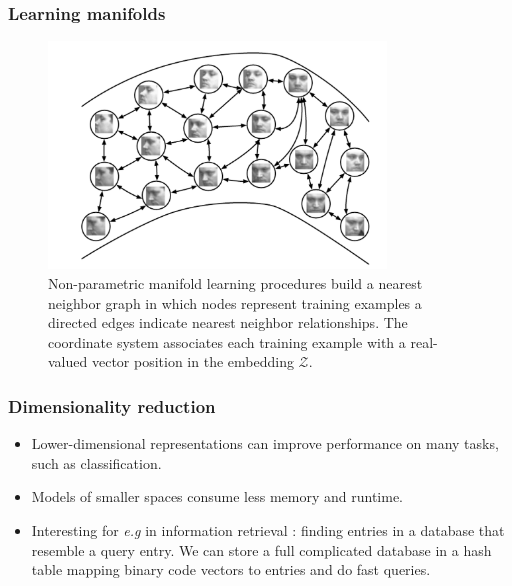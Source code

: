 \documentclass[french,9pt]{beamer}
\begin{document}
\begin{frame}
\frametitle{Learning manifolds}

\begin{figure}
  \begin{center}
    \includegraphics[width=0.8\textwidth]{fig/learning_manifolds.png}
  \end{center}
 \caption{Non-parametric manifold learning procedures build a nearest neighbor graph in which nodes represent training examples a directed edges indicate nearest neighbor relationships. The coordinate system associates each training example with a real-valued vector position in the embedding $\mathcal{Z}$. \cite{Gong:2000:DVI:572750}}
\end{figure}

\end{frame}


\begin{frame}
\frametitle{Dimensionality reduction}
\begin{itemize}
\item Lower-dimensional representations can improve performance on many tasks, such as classification.
\item Models of smaller spaces consume less memory and runtime.
\item Interesting for \textit{e.g} in information retrieval : finding entries in a database that resemble a query entry. We can store a full complicated database in a hash table mapping binary code vectors to entries and do fast queries.
\end{itemize}


\end{frame}

\end{document}
